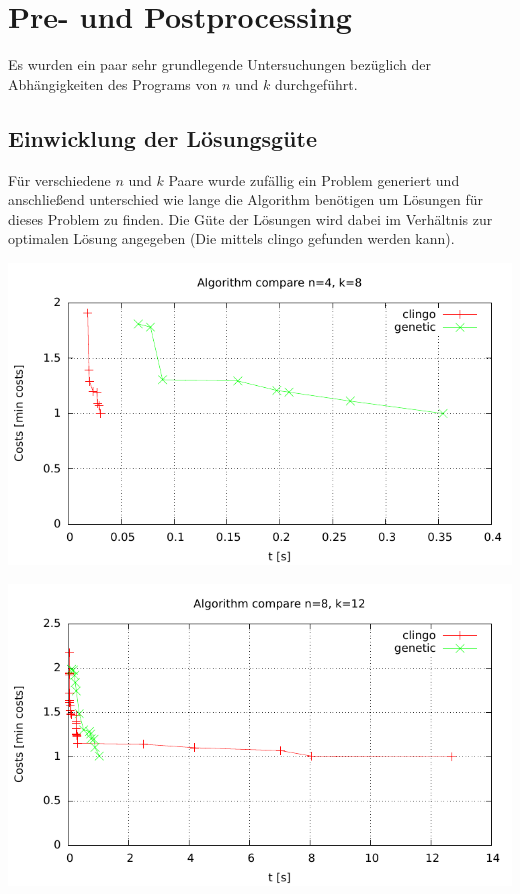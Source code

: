 \section{Pre- und Postprocessing}

Es wurden ein paar sehr grundlegende Untersuchungen bezüglich der Abhängigkeiten des Programs von $n$ und $k$ durchgeführt.

\subsection{Einwicklung der Lösungsgüte}

Für verschiedene $n$ und $k$ Paare wurde zufällig ein Problem generiert und anschließend unterschied wie lange die Algorithm benötigen um Lösungen für dieses Problem zu finden. Die Güte der Lösungen wird dabei im Verhältnis zur optimalen Lösung angegeben (Die mittels clingo gefunden werden kann).

\includegraphics{../../plots/algorithmCompare-n4-k8.pdf}

\includegraphics{../../plots/algorithmCompare-n8-k12.pdf}

